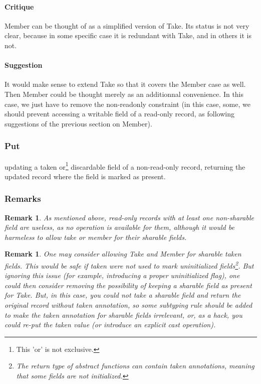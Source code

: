\documentclass{article}
\newtheorem{remark}[theorem]{Remark}
\begin{document}
        \paragraph{Critique}
        Member can be thought of as a simplified version of Take. Its status is
        not very clear, because in some specific case it is redundant with Take,
        and in others it is not.
\paragraph{Suggestion}
It would make sense to extend Take so that it covers the Member case as well.
Then Member could be thought merely as an additionnal convenience.
In this case, we just have to remove the non-readonly constraint (in this case,
some, we should prevent accessing a writable field of a read-only record, as
following suggestions of the previous section on Member).
    \subsubsection{Put}
    updating a taken or\footnote{This 'or' is not exclusive.} discardable field of a non-read-only record, returning the
      updated record where the field is marked as present. 
      \subsubsection{Remarks}
\begin{remark}
    As mentioned above, read-only records with at least one non-sharable field are useless, as no
    operation is available for them, although it would be harmeless to allow
    take or member for their sharable fields.
  \end{remark}
  \begin{remark}
    One may consider allowing Take and Member for sharable taken fields.
    This would be safe if taken were not used to mark uninitialized
    fields\footnote{%
      The return type of abstract functions can contain taken annotations,
      meaning that some fields are not initialized.
    }.
    But ignoring this issue (for example, introducing a proper uninitialized
    flag),
    one could then consider removing the possibility of keeping a sharable field as present for Take.
   But, in this case, you could not take a sharable field and return the
   original record without taken annotation, so some subtyping rule should be
   added to make the taken annotation for sharable fields irrelevant, or, as a
   hack, you could re-put the taken value (or introduce an explicit cast operation).
  \end{remark}
\end{document}
